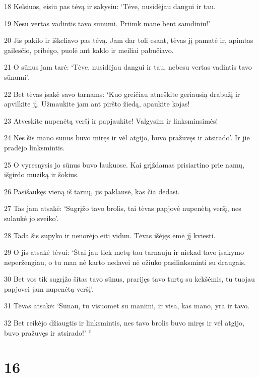 \par 18 Kelsiuos, eisiu pas tėvą ir sakysiu: ‘Tėve, nusidėjau dangui ir tau. 
\par 19 Nesu vertas vadintis tavo sūnumi. Priimk mane bent samdiniu!’ 
\par 20 Jis pakilo ir iškeliavo pas tėvą. Jam dar toli esant, tėvas jį pamatė ir, apimtas gailesčio, pribėgo, puolė ant kaklo ir meiliai pabučiavo. 
\par 21 O sūnus jam tarė: ‘Tėve, nusidėjau dangui ir tau, nebesu vertas vadintis tavo sūnumi’. 
\par 22 Bet tėvas įsakė savo tarnams: ‘Kuo greičiau atneškite geriausią drabužį ir apvilkite jį. Užmaukite jam ant piršto žiedą, apaukite kojas! 
\par 23 Atveskite nupenėtą veršį ir papjaukite! Valgysim ir linksminsimės! 
\par 24 Nes šis mano sūnus buvo miręs ir vėl atgijo, buvo pražuvęs ir atsirado’. Ir jie pradėjo linksmintis. 
\par 25 O vyresnysis jo sūnus buvo laukuose. Kai grįždamas prisiartino prie namų, išgirdo muziką ir šokius. 
\par 26 Pasišaukęs vieną iš tarnų, jis paklausė, kas čia dedasi. 
\par 27 Tas jam atsakė: ‘Sugrįžo tavo brolis, tai tėvas papjovė nupenėtą veršį, nes sulaukė jo sveiko’. 
\par 28 Tada šis supyko ir nenorėjo eiti vidun. Tėvas išėjęs ėmė jį kviesti. 
\par 29 O jis atsakė tėvui: ‘Štai jau tiek metų tau tarnauju ir niekad tavo įsakymo neperžengiau, o tu man nė karto nedavei nė ožiuko pasilinksminti su draugais. 
\par 30 Bet vos tik sugrįžo šitas tavo sūnus, prarijęs tavo turtą su kekšėmis, tu tuojau papjovei jam nupenėtą veršį’. 
\par 31 Tėvas atsakė: ‘Sūnau, tu visuomet su manimi, ir visa, kas mano, yra ir tavo. 
\par 32 Bet reikėjo džiaugtis ir linksmintis, nes tavo brolis buvo miręs ir vėl atgijo, buvo pražuvęs ir atsirado!’ ”



\chapter{16}


